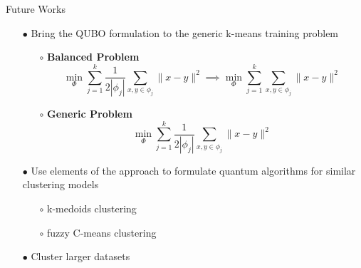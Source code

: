 	\begin{frame}{Future Works}
		\small{
		\begin{itemize}
			\setlength\itemsep{-0.5em}
			\item[$\bullet$] Bring the QUBO formulation to the generic k-means training problem
				\begin{itemize}
					\setlength\itemsep{-0.5em}
					\item[$\circ$] \textbf{Balanced Problem} \small{$$\min _{\Phi} \sum_{j=1}^{k} \frac{1}{2\left|\phi_{j}\right|} \sum_{x, y \in \phi_{j}}\|x-y\|^{2} \implies \min _{\Phi} \sum_{j=1}^{k} \sum_{x, y \in \phi_{j}}\|x-y\|^{2}$$}
					\item[$\circ$] \textbf{Generic Problem} \small{$$\min _{\Phi} \sum_{j=1}^{k} \frac{1}{2\left|\phi_{j}\right|} \sum_{x, y \in \phi_{j}}\|x-y\|^{2}$$}
				\end{itemize}
			\item[$\bullet$] Use elements of the approach to formulate quantum algorithms for similar clustering models
			\begin{itemize}
				\item[$\circ$] k-medoids clustering
				\item[$\circ$] fuzzy C-means clustering
			\end{itemize}
			\item[$\bullet$] Cluster larger datasets 
		\end{itemize}
		}
	\end{frame}



